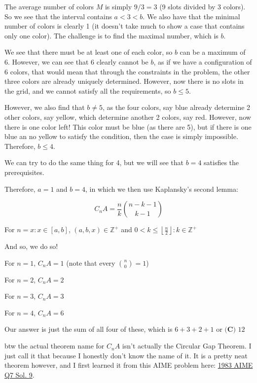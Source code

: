 \begin{enumerate}
 The average number of colors \( M \) is simply \( 9/3 = 3 \) (9 slots divided by 3 colors). So we see that the interval contains \( a < 3 < b \). We also have that the minimal number of colors is clearly 1 (it doesn't take much to show a case that contains only one color). The challenge is to find the maximal number, which is \( b \).

 We see that there must be at least one of each color, so \( b \) can be a maximum of 6. However, we can see that 6 clearly cannot be \( b \), as if we have a configuration of 6 colors, that would mean that through the constraints in the problem, the other three colors are already uniquely determined. However, now there is no slots in the grid, and we cannot satisfy all the requirements, so \( b \le 5 \).

 However, we also find that \( b \ne 5 \), as the four colors, say blue already determine 2 other colors, say yellow, which determine another 2 colors, say red. However, now there is one color left! This color must be blue (as there are 5), but if there is one blue an no yellow to satisfy the condition, then the case is simply impossible. Therefore, \( b \le 4 \).

 We can try to do the same thing for 4, but we will see that \( b=4 \) satisfies the prerequisites.

 Therefore, \( a=1 \) and \( b=4 \), in which we then use Kaplansky's second lemma:

 
 \[C_n A = \frac{n}{k} \binom{n-k-1}{k-1}\]

 For \( n=x : x \in [a,b] \), \( (a,b,x) \in \mathbb{Z}^+ \) and \( 0 < k \le \left\lfloor\frac{n}{2}\right\rfloor : k \in \mathbb{Z}^+ \)

 And so, we do so!

 For \( n=1 \), \( C_n A = 1 \) (note that every $\binom{n}{0}=1$)

 For \( n=2 \), \( C_n A = 2 \)

 For \( n=3 \), \( C_n A = 3 \)

 For \( n=4 \), \( C_n A = 6 \)

 Our answer is just the sum of all four of these, which is \( 6+3+2+1 \) or $\boxed{\textbf{(C) } 12}$

 btw the actual theorem name for \( C_n A \) isn't actually the Circular Gap Theorem. I just call it that because I honestly don't know the name of it. It is a pretty neat theorem however, and I first learned it from this AIME problem here: \href{https://artofproblemsolving.com/wiki/index.php?title=1983\_AIME\_Problems/Problem\_7}{1983 AIME Q7 Sol. 9}.


\end{enumerate}
